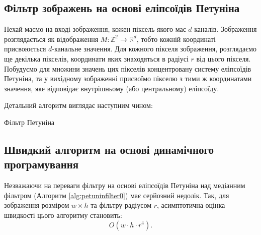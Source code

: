 \subsection{Фільтр зображень на основі еліпсоїдів Петуніна}

Нехай маємо на вході зображення, кожен піксель якого має \(d\) каналів. Зображення розглядається як відображення \(M: \mathbb{Z^2} \rightarrow \mathbb{R}^d\), тобто кожній координаті присвоюється \(d\)-канальне значення. Для кожного пікселя зображення, розглядаємо ще декілька пікселів, координати яких знаходяться в радіусі \(r\) від цього пікселя. Побудуємо для множини значень цих пікселів концентровану систему еліпсоїдів Петуніна, та у вихідному зображенні присвоїмо пікселю з тими ж координатами значення, яке відповідає внутрішньому (або центральному) еліпсоїду.

Детальний алгоритм виглядає наступним чином:

\begin{megaalgorithm}[H] \label{alg:petuninfilter0}
	\caption{Фільтр Петуніна}
	
	\BlankLine 
	
		
\end{megaalgorithm}


\subsection{Швидкий алгоритм на основі динамічного програмування}

Незважаючи на переваги фільтру на основі еліпсоїдів Петуніна над медіанним фільтром (Алгоритм \ref{alg:petuninfilter0}) має серйозний недолік. Так, для зображення розміром \(w \times h\) та фільтру радіусом \(r\), асимптотична оцінка швидкості цього алгоритму становить:
\begin{equation*}
O\left( w \cdot h \cdot r^4 \right).
\end{equation*}

